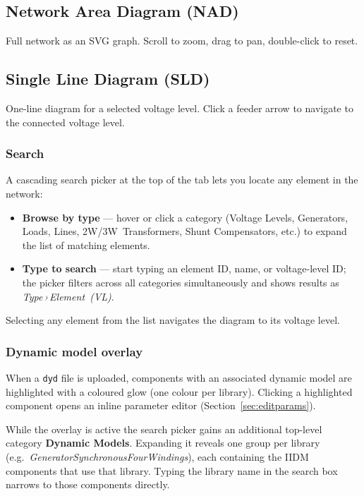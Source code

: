 \documentclass[a4paper,11pt]{article}
\newcommand{\ftype}[1]{\texttt{\small\color{rteblu}#1}}
\begin{document}
\subsection{Network Area Diagram (NAD)}

Full network as an SVG graph. Scroll to zoom, drag to pan, double-click to
reset.

\subsection{Single Line Diagram (SLD)}

One-line diagram for a selected voltage level. Click a feeder arrow to navigate
to the connected voltage level.

\subsubsection{Search}

A cascading search picker at the top of the tab lets you locate any element in
the network:

\begin{itemize}[leftmargin=2em]
  \item \textbf{Browse by type} --- hover or click a category (Voltage Levels,
    Generators, Loads, Lines, 2W/3W~Transformers, Shunt Compensators, etc.) to
    expand the list of matching elements.
  \item \textbf{Type to search} --- start typing an element ID, name, or
    voltage-level ID; the picker filters across all categories simultaneously
    and shows results as \emph{Type\,›\,Element~(VL)}.
\end{itemize}

Selecting any element from the list navigates the diagram to its voltage level.

\subsubsection{Dynamic model overlay}

When a \ftype{dyd} file is uploaded, components with an associated dynamic
model are highlighted with a coloured glow (one colour per library). Clicking a
highlighted component opens an inline parameter editor
(Section~\ref{sec:editparams}).

While the overlay is active the search picker gains an additional top-level
category \textbf{Dynamic Models}. Expanding it reveals one group per library
(e.g.\ \emph{GeneratorSynchronousFourWindings}), each containing the IIDM
components that use that library. Typing the library name in the search box
narrows to those components directly.
\end{document}
